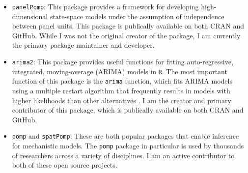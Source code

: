 \documentclass{article}
\begin{document}
\begin{itemize}
    \item \texttt{panelPomp}: This package provides a framework for developing high-dimensional state-space models under the assumption of independence between panel units.
    This package is publically available on both CRAN and GitHub.
    While I was not the original creator of the package, I am currently the primary package maintainer and developer.

    \item \texttt{arima2}: This package provides useful functions for fitting auto-regressive, integrated, moving-average (ARIMA) models in \texttt{R}. The most important function of this package is the \texttt{arima} function, which fits ARIMA models using a multiple restart algorithm that frequently results in models with higher likelihoods than other alternatives \cite{wheelerARMA}.
    I am the creator and primary contributor of this package, which is publically available on both CRAN and GitHub.

    \item \texttt{pomp} and \texttt{spatPomp}: These are both popular packages that enable inference for mechanistic models. The \texttt{pomp} package in particular is used by thousands of researchers across a variety of disciplines. I am an active contributor to both of these open source projects.


\end{itemize}



\end{document}
